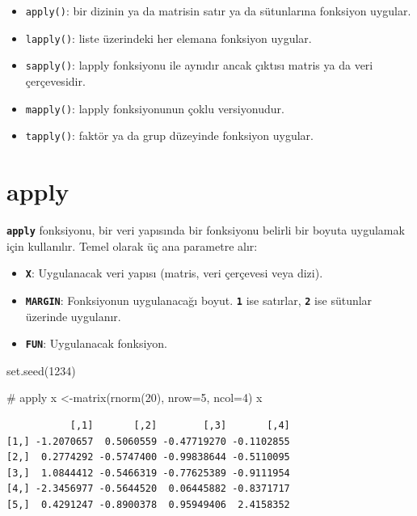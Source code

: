 \documentclass[
  letterpaper,
  DIV=11,
  numbers=noendperiod]{scrreprt}
\newenvironment{Shaded}{\begin{snugshade}}{\end{snugshade}}
\newcommand{\AttributeTok}[1]{\textcolor[rgb]{0.40,0.45,0.13}{#1}}
\newcommand{\CommentTok}[1]{\textcolor[rgb]{0.37,0.37,0.37}{#1}}
\newcommand{\DecValTok}[1]{\textcolor[rgb]{0.68,0.00,0.00}{#1}}
\newcommand{\FunctionTok}[1]{\textcolor[rgb]{0.28,0.35,0.67}{#1}}
\newcommand{\NormalTok}[1]{\textcolor[rgb]{0.00,0.23,0.31}{#1}}
\newcommand{\OtherTok}[1]{\textcolor[rgb]{0.00,0.23,0.31}{#1}}
\begin{document}
\begin{itemize}
\item
  \texttt{apply()}: bir dizinin ya da matrisin satır ya da sütunlarına
  fonksiyon uygular.
\item
  \texttt{lapply()}: liste üzerindeki her elemana fonksiyon uygular.
\item
  \texttt{sapply()}: lapply fonksiyonu ile aynıdır ancak çıktısı matris
  ya da veri çerçevesidir.
\item
  \texttt{mapply()}: lapply fonksiyonunun çoklu versiyonudur.
\item
  \texttt{tapply()}: faktör ya da grup düzeyinde fonksiyon uygular.
\end{itemize}

\section{apply}\label{apply}

\textbf{\texttt{apply}} fonksiyonu, bir veri yapısında bir fonksiyonu
belirli bir boyuta uygulamak için kullanılır. Temel olarak üç ana
parametre alır:

\begin{itemize}
\item
  \textbf{\texttt{X}}: Uygulanacak veri yapısı (matris, veri çerçevesi
  veya dizi).
\item
  \textbf{\texttt{MARGIN}}: Fonksiyonun uygulanacağı boyut.
  \textbf{\texttt{1}} ise satırlar, \textbf{\texttt{2}} ise sütunlar
  üzerinde uygulanır.
\item
  \textbf{\texttt{FUN}}: Uygulanacak fonksiyon.
\end{itemize}

\begin{Shaded}
\begin{Highlighting}[]
\FunctionTok{set.seed}\NormalTok{(}\DecValTok{1234}\NormalTok{)}

\CommentTok{\# apply}
\NormalTok{x }\OtherTok{\textless{}{-}}\FunctionTok{matrix}\NormalTok{(}\FunctionTok{rnorm}\NormalTok{(}\DecValTok{20}\NormalTok{), }\AttributeTok{nrow=}\DecValTok{5}\NormalTok{, }\AttributeTok{ncol=}\DecValTok{4}\NormalTok{)}
\NormalTok{x}
\end{Highlighting}
\end{Shaded}

\begin{verbatim}
           [,1]       [,2]        [,3]       [,4]
[1,] -1.2070657  0.5060559 -0.47719270 -0.1102855
[2,]  0.2774292 -0.5747400 -0.99838644 -0.5110095
[3,]  1.0844412 -0.5466319 -0.77625389 -0.9111954
[4,] -2.3456977 -0.5644520  0.06445882 -0.8371717
[5,]  0.4291247 -0.8900378  0.95949406  2.4158352
\end{verbatim}
\end{document}
